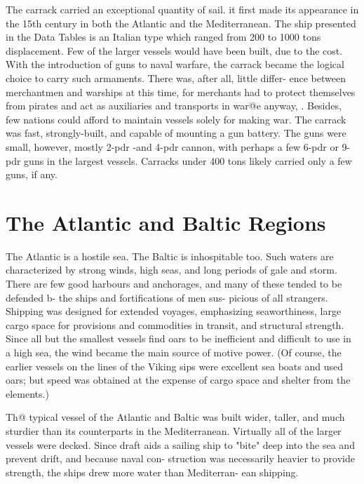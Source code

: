 \documentclass{article}
\begin{document}
\begin{multicols}{2}
The carrack carried an exceptional quantity of sail.  it first made
its appearance in the 15th century in both the Atlantic and the
Mediterranean.  The ship presented in the Data Tables is an Italian
type which ranged from 200 to 1000 tons displacement.  Few of the
larger vessels would have been built, due to the cost.  With the
introduction of guns to naval warfare, the carrack became the logical
choice to carry such armaments.  There was, after all, little differ-
ence between merchantmen and warships at this time, for merchants had
to protect themselves from pirates and act as auxiliaries and
transports in war@e anyway, . Besides, few nations could afford to
maintain vessels solely for making war.  The carrack was fast,
strongly-built, and capable of mounting a gun battery.  The guns were
small, however, mostly 2-pdr -and 4-pdr cannon, with perhaps a few
6-pdr or 9-pdr guns in the largest vessels.  Carracks under 400 tons
likely carried only a few guns, if any.

\section{The Atlantic and Baltic Regions}

The Atlantic is a hostile sea.  The Baltic is inhospitable too.  Such
waters are characterized by strong winds, high seas, and long periods
of gale and storm.  There are few good harbours and anchorages, and
many of these tended to be defended b- the ships and fortifications of
men sus- picious of all strangers.  Shipping was designed for extended
voyages, emphasizing seaworthiness, large cargo space for provisions
and commodities in transit, and structural strength.  Since all but
the smallest vessels find oars to be inefficient and difficult to use
in a high sea, the wind became the main source of motive power. (Of
course, the earlier vessels on the lines of the Viking sips were
excellent sea boats and used oars; but speed was obtained at the
expense of cargo space and shelter from the elements.)

Th@ typical vessel of the Atlantic and Baltic was built wider, taller,
and much sturdier than its counterparts in the
Mediterranean. Virtually all of the larger vessels were decked.  Since
draft aids a sailing ship to "bite" deep into the sea and prevent
drift, and because naval con- struction was necessarily heavier to
provide strength, the ships drew more water than Mediterran- ean
shipping.


\end{multicols}
\end{document}
